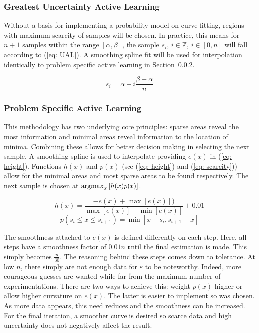 \subsubsection{Greatest Uncertainty Active Learning}
Without a basis for implementing a probability model on curve fitting, regions with maximum scarcity of samples will be chosen. In practice, this means for $n+1$ samples within the range $[\alpha, \beta]$, the sample $s_i$, $i\in\mathbb{Z}$, $i\in[0, n]$ will fall according to (\ref{eq: UAL}). A smoothing spline fit will be used for interpolation identically to problem specific active learning in Section~\ref{sssec:Active Learning}.

\begin{equation}
  \label{eq: UAL}
  s_i=\alpha+i\frac{\beta-\alpha}{n}
\end{equation}

\subsubsection{Problem Specific Active Learning}
\label{sssec:Active Learning}
This methodology has two underlying core principles: sparse areas reveal the most information and minimal areas reveal information to the location of minima. Combining these allows for better decision making in selecting the next sample. A smoothing spline is used to interpolate providing $e(x)$ in (\ref{eq: height}). Functions $h(x)$ and $p(x)$ (see (\ref{eq: height}) and (\ref{eq: scarcity})) allow for the minimal areas and most sparse areas to be found respectively. The next sample is chosen at ${\operatorname*{argmax}_x{[h(x)p(x)]}}$.

\begin{equation}
  \label{eq: height}
  {h(x)=\frac{-e(x)+\max[e(x)])}{\max[e(x)]-\min[e(x)]}}+0.01
\end{equation}
\begin{equation}
  \label{eq: scarcity}
  p(s_i \le x \le s_{i+1})=\min[x-s_i, s_{i+1}-x]
\end{equation}

The smoothness attached to $e(x)$ is defined differently on each step. Here, all steps have a smoothness factor of $0.01n$ until the final estimation is made. This simply becomes $\frac{n}{30}$. The reasoning behind these steps comes down to tolerance. At low $n$, there simply are not enough data for $\varepsilon$ to be noteworthy. Indeed, more courageous guesses are wanted while far from the maximum number of experimentations. There are two ways to achieve this: weight $p(x)$ higher or allow higher curvature on $e(x)$. The latter is easier to implement so was chosen. As more data appears, this need reduces and the smoothness can be increased. For the final iteration, a smoother curve is desired so scarce data and high uncertainty does not negatively affect the result.

